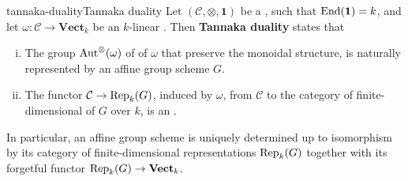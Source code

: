 \begin{topic}{tannaka-duality}{Tannaka duality}
    Let $(\mathcal{C}, \otimes, \textbf{1})$ be a   , such that $\textup{End}(\textbf{1}) = k$, and let $\omega : \mathcal{C} \to \textbf{Vect}_k$ be an   $k$-linear  . Then \textbf{Tannaka duality} states that
    \begin{enumerate}[(i)]
        \item The group $\textup{Aut}^\otimes(\omega)$ of  of $\omega$ that preserve the monoidal structure, is naturally represented by an affine group scheme $G$.
        \item The functor $\mathcal{C} \to \textup{Rep}_k(G)$, induced by $\omega$, from $\mathcal{C}$ to the category of finite-dimensional  of $G$ over $k$, is an .
    \end{enumerate}
    In particular, an affine group scheme is uniquely determined up to isomorphism by its category of finite-dimensional representations $\textup{Rep}_k(G)$ together with its forgetful functor $\textup{Rep}_k(G) \to \textbf{Vect}_k$.
\end{topic}

